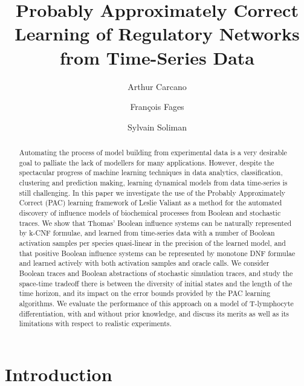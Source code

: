 \documentclass{llncs}
\begin{document}
\title{Probably Approximately Correct Learning of Regulatory Networks from Time-Series Data}

\author{Arthur Carcano \and Fran\c{c}ois Fages \and Sylvain
Soliman}


\maketitle

\begin{abstract}
Automating the process of model building from experimental data 
is a very desirable goal to palliate the lack of modellers for many applications.
However, despite the spectacular progress of machine learning techniques in data analytics, classification, clustering and prediction making,
learning dynamical models from data time-series is still challenging.
In this paper we investigate the use of the Probably Approximately Correct (PAC) learning 
framework of Leslie Valiant as a method for the automated discovery of influence models of biochemical processes from Boolean and stochastic traces. 
We show that Thomas' Boolean influence systems can be naturally represented by k-CNF formulae,
and learned
from time-series data with a number of Boolean activation samples per species quasi-linear in the precision of the learned model,
and that positive Boolean influence systems can be represented by monotone DNF formulae
and learned actively with both activation samples and oracle calls.
We consider Boolean traces and Boolean abstractions of stochastic simulation traces,
and study the space-time tradeoff there is between the diversity of initial states and the length of the time horizon, 
and its impact on the error bounds provided by the PAC learning algorithms.
We evaluate the performance of this approach on a model of T-lymphocyte
differentiation, with and without prior knowledge,
and discuss its merits as well as its limitations with respect to realistic experiments.
\end{abstract}

\section{Introduction}
\end{document}
